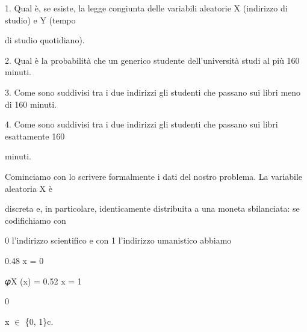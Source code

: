 \documentclass[a4paper,portrait,12pt]{article}
\begin{document}
\begin{flushleft}
1. Qual \`{e}, se esiste, la legge congiunta delle variabili aleatorie X (indirizzo di studio) e Y (tempo
\end{flushleft}


\begin{flushleft}
di studio quotidiano).
\end{flushleft}


\begin{flushleft}
2. Qual \`{e} la probabilit\`{a} che un generico studente dell'universit\`{a} studi al più 160 minuti.
\end{flushleft}


\begin{flushleft}
3. Come sono suddivisi tra i due indirizzi gli studenti che passano sui libri meno di 160 minuti.
\end{flushleft}


\begin{flushleft}
4. Come sono suddivisi tra i due indirizzi gli studenti che passano sui libri esattamente 160
\end{flushleft}


\begin{flushleft}
minuti.
\end{flushleft}


\begin{flushleft}
Cominciamo con lo scrivere formalmente i dati del nostro problema. La variabile aleatoria X \`{e}
\end{flushleft}


\begin{flushleft}
discreta e, in particolare, identicamente distribuita a una moneta sbilanciata: se codifichiamo con
\end{flushleft}


\begin{flushleft}
0 l'indirizzo scientifico e con 1 l'indirizzo umanistico abbiamo
\end{flushleft}


\begin{flushleft}
0.48 x = 0
\end{flushleft}


\begin{flushleft}
𝜑X (x) = 0.52 x = 1
\end{flushleft}


0


\begin{flushleft}
x $\in$ \{0, 1\}c.
\end{flushleft}
\end{document}

